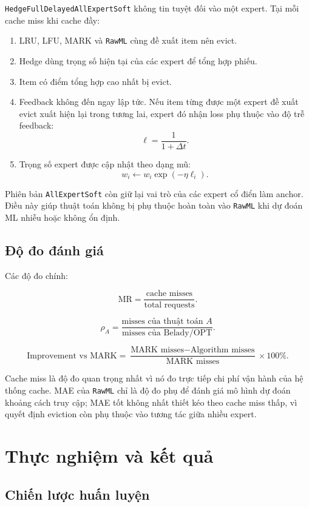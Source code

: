 \documentclass[11pt,a4paper]{article}
\newcommand{\code}[1]{\texttt{#1}}
\newcommand{\hedge}{\code{HedgeFullDelayedAllExpertSoft}}
\newcommand{\rawml}{\code{RawML}}
\newcommand{\mr}{\mathrm{MR}}
\begin{document}
\hedge{} không tin tuyệt đối vào một expert. Tại mỗi cache miss khi cache đầy:

\begin{enumerate}[leftmargin=1.4em]
    \item LRU, LFU, MARK và \rawml{} cùng đề xuất item nên evict.
    \item Hedge dùng trọng số hiện tại của các expert để tổng hợp phiếu.
    \item Item có điểm tổng hợp cao nhất bị evict.
    \item Feedback không đến ngay lập tức. Nếu item từng được một expert đề xuất evict xuất hiện lại trong tương lai, expert đó nhận loss phụ thuộc vào độ trễ feedback:
    \[
        \ell = \frac{1}{1 + \Delta t}.
    \]
    \item Trọng số expert được cập nhật theo dạng mũ:
    \[
        w_i \leftarrow w_i \exp(-\eta \ell_i).
    \]
\end{enumerate}

Phiên bản \code{AllExpertSoft} còn giữ lại vai trò của các expert cổ điển làm anchor. Điều này giúp thuật toán không bị phụ thuộc hoàn toàn vào \rawml{} khi dự đoán ML nhiễu hoặc không ổn định.

\subsection{Độ đo đánh giá}

Các độ đo chính:

\[
    \mr = \frac{\text{cache misses}}{\text{total requests}}.
\]

\[
    \rho_A = \frac{\text{misses của thuật toán } A}{\text{misses của Belady/OPT}}.
\]

\[
    \text{Improvement vs MARK}
    =
    \frac{\text{MARK misses} - \text{Algorithm misses}}
    {\text{MARK misses}}
    \times 100\%.
\]

Cache miss là độ đo quan trọng nhất vì nó đo trực tiếp chi phí vận hành của hệ thống cache. MAE của \rawml{} chỉ là độ đo phụ để đánh giá mô hình dự đoán khoảng cách truy cập; MAE tốt không nhất thiết kéo theo cache miss thấp, vì quyết định eviction còn phụ thuộc vào tương tác giữa nhiều expert.

\section{Thực nghiệm và kết quả}

\subsection{Chiến lược huấn luyện}
\end{document}
